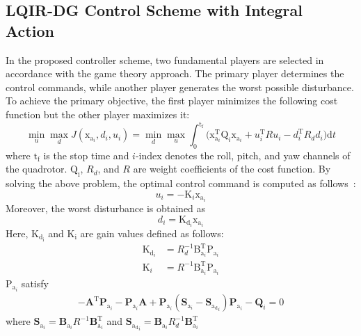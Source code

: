 \documentclass[3p]{elsarticle}
\begin{document}
\subsection{LQIR-DG Control Scheme with Integral Action}
\noindent In the proposed controller scheme, two fundamental players are selected in accordance with the game theory approach. The primary player determines the control commands, while another player generates the worst possible disturbance.
To achieve the primary objective, the first player minimizes the following cost function but the other player maximizes it:
\begin{equation}\label{eq:min_max_cost_function}
    \min_{u} \max_{d} J(\boldsymbol{\mathrm{x}}_{\textrm{a}_i}, {d_i}, {u_i})= \min_{d} \max_{u}
     \int_{0}^{\mathrm{t_f}}\biggl (\boldsymbol{\mathrm{x}}^\mathrm{T}_{\textrm{a}_i}  \boldsymbol{\mathrm{Q}}_i \boldsymbol{\mathrm{x}}_{\textrm{a}_i}+
    {{u^\mathrm{T}_i}}  {{R}} {{u_i}}-
    {{d^\mathrm{T}_{i}}} {{ R_{d} d_{i}}}
    \biggl )\mathrm{d}t
\end{equation}
where $\mathrm{t_f}$ is the stop time and $i$-index denotes the roll, pitch, and yaw channels of the quadrotor. $\boldsymbol{\mathrm{Q_i}}$, ${{R_{d}}}$, and ${{R}}$ are weight coefficients of the cost function.
By solving the above problem, the optimal control command is computed as follows~\cite{LQDG}:
\begin{equation}
    {{u_i}} = -\boldsymbol{{\mathrm{K}}}_{i} \boldsymbol{{\mathrm{x}}}_{\textrm{a}_i}
\end{equation}
Moreover, the worst disturbance is obtained as
\begin{equation}
    {{d_i}} =\boldsymbol{{\mathrm{K}}}_{\textrm{d}_i}\boldsymbol{{\mathrm{x}}}_{\mathrm{a}_i}
\end{equation}
Here, $\boldsymbol{{\mathrm{K_{d_i}}}}$ and $\boldsymbol{{\mathrm{K_i}}}$ are gain values defined as follows:
\begin{align}
    \boldsymbol{{\mathrm{K}}}_{\textrm{d}_i} &= {{{R}}^{-1}_{d}}\boldsymbol{{\mathrm{B}}}_{\mathrm{a}_{i}}^\mathrm{T}\boldsymbol{{\mathrm{P}}}_{\mathrm{a}_{i}}\\
    \boldsymbol{{\mathrm{K}}}_{i} &= {{{R}}^{-1}}
    \boldsymbol{{\mathrm{B}}}_{\mathrm{a}_{i}}^\mathrm{T}
    \boldsymbol{{\mathrm{P}}}_{\mathrm{a}_{i}}
\end{align}
$\boldsymbol{{\mathrm{P}}}_{\mathrm{a}_{i}}$ satisfy
\begin{align}\label{coupled_riccatti_LQIDG}
    -\mathbf{A}^\mathrm{T}\mathbf{P}_{\mathrm{a}_{i}} - \mathbf{P}_{\mathrm{a}_{i}}\mathbf{A} + \mathbf{P}_{\mathrm{a}_{i}}(\mathbf{S}_{\mathrm{a}_i} - \mathbf{S}_{\mathrm{a_d}_i}) \mathbf{P}_{\mathrm{a}_{i}} - \mathbf{Q}_{i} = 0 
\end{align}
 where $\mathbf{S}_{\mathrm{a}_i} = \mathbf{B}_{\mathrm{a}_i}{R}^{-1}\mathbf{B}_{\mathrm{a}_i}^\mathrm{T}$ and $\mathbf{S}_{\mathrm{a_d}_i} = \mathbf{B}_{\mathrm{a}_i}{R}_d^{-1}\mathbf{B}_{\mathrm{a}_i}^\mathrm{T}$
\end{document}
